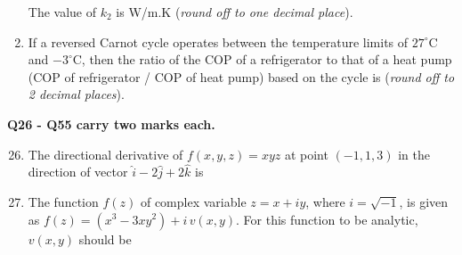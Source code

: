 \documentclass[12pt,onecolumn]{article}
\begin{document}
\begin{enumerate}
          The value of $k_2$ is \underline{\hspace{2cm}} W/m.K (\textit{round off to one decimal place}).

    \item If a reversed Carnot cycle operates between the temperature limits of $27^\circ$C and $-3^\circ$C, then the ratio of the COP of a refrigerator to that of a heat pump (COP of refrigerator / COP of heat pump) based on the cycle is \underline{\hspace{2cm}} (\textit{round off to 2 decimal places}).
\end{enumerate}

\noindent\textbf{Q26 - Q55 carry two marks each.}
\begin{enumerate}
    \setcounter{enumi}{25}
    \item The directional derivative of $f(x, y, z) = xyz$ at point $(-1, 1, 3)$ in the direction of vector $\hat{i} - 2\hat{j} + 2\hat{k}$ is
          \begin{enumerate}
          \end{enumerate}

    \item The function $f(z)$ of complex variable $z = x + i y$, where $i = \sqrt{-1}$, is given as $f(z) = (x^3 - 3x y^2) + i\, v(x, y)$. For this function to be analytic, $v(x, y)$ should be
          \begin{enumerate}
          \end{enumerate}


\end{enumerate}
\end{document}
